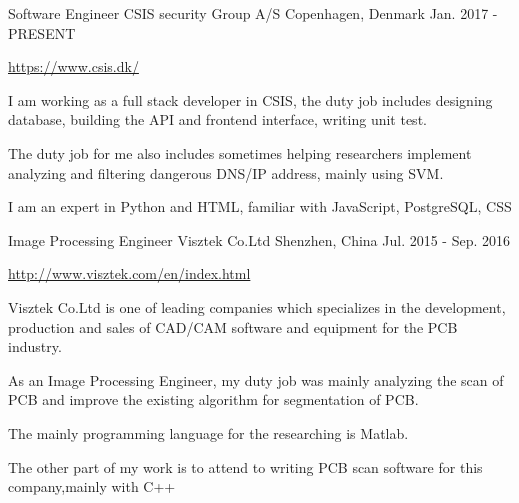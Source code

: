 \begin{cventries}
  \cventry
    {Software Engineer}
    {CSIS security Group A/S}
    {Copenhagen, Denmark}
    {Jan. 2017 - PRESENT}
    {
      \begin{cvitems}
        \item {\url{https://www.csis.dk/}}
        \item {I am working as a full stack developer in CSIS, the duty job includes designing database, building the API and frontend interface, writing unit test.}
        \item {The duty job for me also includes sometimes helping researchers implement analyzing and filtering dangerous  DNS/IP address, mainly using SVM.}
        \item {I am an expert in Python and HTML, familiar with JavaScript, PostgreSQL, CSS}
      \end{cvitems}
    }
  \cventry
    {Image Processing Engineer}
    {Visztek Co.Ltd}
    {Shenzhen, China}
    {Jul. 2015 - Sep. 2016}
    {
      \begin{cvitems}
        \item {\url{http://www.visztek.com/en/index.html}}
        \item {Visztek Co.Ltd is one of leading companies which specializes in the development, production and sales of CAD/CAM software and equipment for the PCB industry.}
        \item {As an Image Processing Engineer, my duty job was mainly analyzing the scan of PCB and improve the existing algorithm for segmentation of PCB.}
        \item {The mainly programming language for the researching is Matlab.}
        \item {The other part of my work is to attend to writing PCB scan software for this company,mainly with C++}
      \end{cvitems}
    }
\end{cventries}
